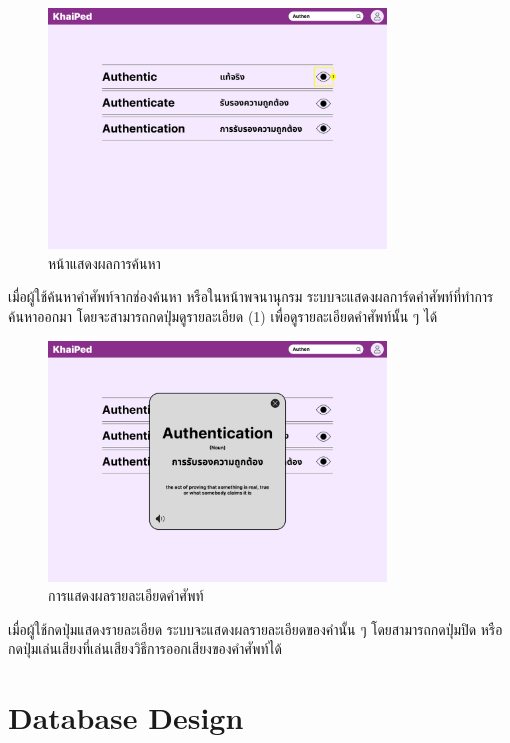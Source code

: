 \documentclass[12pt,oneside,openright,a4paper]{cpe-thai-project}
\begin{document}
\begin{figure}[!h]\centering
	\includegraphics[width=0.8\textwidth, keepaspectratio=true]{image/chap3/ui/dict/Dictionary - Search Word.png}
	\caption{หน้าแสดงผลการค้นหา}\label{fig:UI_DictionarySearch}
\end{figure}
\hspace{1cm}
เมื่อผู้ใช้ค้นหาคำศัพท์จากช่องค้นหา หรือในหน้าพจนานุกรม ระบบจะแสดงผลการ์ดคำศัพท์ที่ทำการค้นหาออกมา โดยจะสามารถกดปุ่มดูรายละเอียด (1) เพื่อดูรายละเอียดคำศัพท์นั้น ๆ ได้

\pagebreak
\begin{figure}[!h]\centering
	\includegraphics[width=0.8\textwidth, keepaspectratio=true]{image/chap3/ui/dict/Dictionary - View Word.png}
	\caption{การแสดงผลรายละเอียดคำศัพท์}\label{fig:UI_DictionaryView}
\end{figure}
\hspace{1cm}
เมื่อผู้ใช้กดปุ่มแสดงรายละเอียด ระบบจะแสดงผลรายละเอียดของคำนั้น ๆ โดยสามารถกดปุ่มปิด หรือกดปุ่มเล่นเสียงที่เล่นเสียงวิธีการออกเสียงของคำศัพท์ได้

\pagebreak
\section{Database Design}
\end{document}
